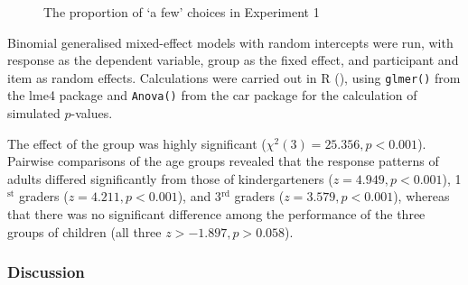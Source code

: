 \documentclass[output=paper]{langscibook}
\begin{document}
\begin{figure}
    \caption{The proportion of `a few' choices in Experiment 1}
    \label{kis-zet:exp1 results}
\end{figure}

Binomial generalised mixed-effect models with random intercepts were run, with response as the dependent variable, group as the fixed effect, and participant and item as random effects. Calculations were carried out in R (\citealt{rcore19}), using \texttt{glmer()} from the lme4 package \citep{bates2015fitting} and \texttt{Anova()} from the car package \citep{fox2018r} for the calculation of simulated $p$-values.

The effect of the group was highly significant ($\chi^{2}(3) = 25.356, p < 0.001$). Pairwise comparisons of the age groups revealed that the response patterns of adults differed significantly from those of kindergarteners ($z = 4.949, p < 0.001$), 1$^\text{st}$ graders ($z = 4.211, p < 0.001$), and 3$^\text{rd}$ graders ($z = 3.579, p < 0.001$), whereas that there was no significant difference among the performance of the three groups of children (all three $z > -1.897, p > 0.058$).    

\subsubsection{Discussion} 
\end{document}
